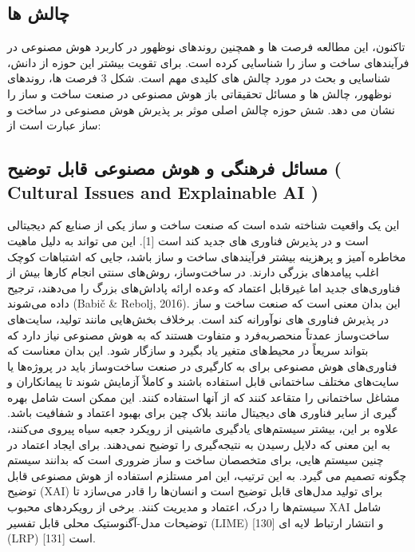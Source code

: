 \documentclass[towcolumn, 11pt]{Article}
\begin{document}
\begin{چکیده}
\section{چالش ها}
تاکنون، این مطالعه فرصت ها و همچنین روندهای نوظهور در کاربرد هوش مصنوعی در فرآیندهای ساخت و ساز را شناسایی کرده است. برای تقویت بیشتر این حوزه از دانش، شناسایی و بحث در مورد چالش های کلیدی مهم است. شکل 3 فرصت ها، روندهای نوظهور، چالش ها و مسائل تحقیقاتی باز هوش مصنوعی در صنعت ساخت و ساز را نشان می دهد. شش حوزه چالش اصلی موثر بر پذیرش هوش مصنوعی در ساخت و ساز عبارت است از:

\subsection{مسائل فرهنگی و هوش مصنوعی قابل توضیح 
( Cultural Issues and Explainable AI )}
این یک واقعیت شناخته شده است که صنعت ساخت و ساز یکی از صنایع کم دیجیتالی است و در پذیرش فناوری های جدید کند است [1]. این می تواند به دلیل ماهیت مخاطره آمیز و پرهزینه بیشتر فرآیندهای ساخت و ساز باشد، جایی که اشتباهات کوچک اغلب پیامدهای بزرگی دارند. در ساخت‌وساز، روش‌های سنتی انجام کارها بیش از فناوری‌های جدید اما غیرقابل اعتماد که وعده ارائه پاداش‌های بزرگ را می‌دهند، ترجیح داده می‌شوند (Babič & Rebolj, 2016). این بدان معنی است که صنعت ساخت و ساز در پذیرش فناوری های نوآورانه کند است. برخلاف بخش‌هایی مانند تولید، سایت‌های ساخت‌وساز عمدتاً منحصربه‌فرد و متفاوت هستند که به هوش مصنوعی نیاز دارد که بتواند سریعاً در محیط‌های متغیر یاد بگیرد و سازگار شود. این بدان معناست که فناوری‌های هوش مصنوعی برای به کارگیری در صنعت ساخت‌وساز باید در پروژه‌ها یا سایت‌های مختلف ساختمانی قابل استفاده باشند و کاملاً آزمایش شوند تا پیمانکاران و مشاغل ساختمانی را متقاعد کنند که از آنها استفاده کنند. این ممکن است شامل بهره گیری از سایر فناوری های دیجیتال مانند بلاک چین برای بهبود اعتماد و شفافیت باشد. علاوه بر این، بیشتر سیستم‌های یادگیری ماشینی از رویکرد جعبه سیاه پیروی می‌کنند، به این معنی که دلایل رسیدن به نتیجه‌گیری را توضیح نمی‌دهند. برای ایجاد اعتماد در چنین سیستم هایی، برای متخصصان ساخت و ساز ضروری است که بدانند سیستم چگونه تصمیم می گیرد. به این ترتیب، این امر مستلزم استفاده از هوش مصنوعی قابل توضیح (XAI) برای تولید مدل‌های قابل توضیح است و انسان‌ها را قادر می‌سازد تا سیستم‌ها را درک، اعتماد و مدیریت کنند. برخی از رویکردهای محبوب XAI شامل توضیحات مدل-آگنوستیک محلی قابل تفسیر (LIME) [130] و انتشار ارتباط لایه ای (LRP) [131] است.


\end{چکیده}
\end{document}
